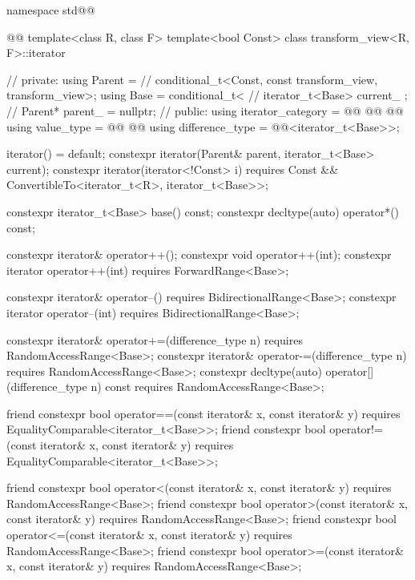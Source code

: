 {\begin{codeblock}
namespace std@@ { @@
  template<class R, class F>
  template<bool Const>
  class transform_view<R, F>::iterator { // \expos
  private:
    using Parent =                 // \expos
      conditional_t<Const, const transform_view, transform_view>;
    using Base   = conditional_t<  // \expos
    iterator_t<Base> current_ {};  // \expos
    Parent* parent_ = nullptr;     // \expos
  public:
    using iterator_category = @\newtxt{\seebelownc;}@
      @@
    @@
    using value_type        =
      @@
      @@
    using difference_type   = @@<iterator_t<Base>>;

    iterator() = default;
    constexpr iterator(Parent& parent, iterator_t<Base> current);
    constexpr iterator(iterator<!Const> i)
      requires Const && ConvertibleTo<iterator_t<R>, iterator_t<Base>>;

    constexpr iterator_t<Base> base() const;
    constexpr decltype(auto) operator*() const;

    constexpr iterator& operator++();
    constexpr void operator++(int);
    constexpr iterator operator++(int) requires ForwardRange<Base>;

    constexpr iterator& operator--() requires BidirectionalRange<Base>;
    constexpr iterator operator--(int) requires BidirectionalRange<Base>;

    constexpr iterator& operator+=(difference_type n)
      requires RandomAccessRange<Base>;
    constexpr iterator& operator-=(difference_type n)
      requires RandomAccessRange<Base>;
    constexpr decltype(auto) operator[](difference_type n) const
      requires RandomAccessRange<Base>;

    friend constexpr bool operator==(const iterator& x, const iterator& y)
      requires EqualityComparable<iterator_t<Base>>;
    friend constexpr bool operator!=(const iterator& x, const iterator& y)
      requires EqualityComparable<iterator_t<Base>>;

    friend constexpr bool operator<(const iterator& x, const iterator& y)
      requires RandomAccessRange<Base>;
    friend constexpr bool operator>(const iterator& x, const iterator& y)
      requires RandomAccessRange<Base>;
    friend constexpr bool operator<=(const iterator& x, const iterator& y)
      requires RandomAccessRange<Base>;
    friend constexpr bool operator>=(const iterator& x, const iterator& y)
      requires RandomAccessRange<Base>;

}}
\end{codeblock}}
